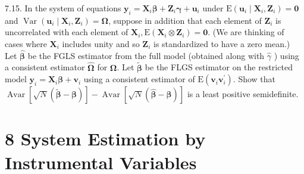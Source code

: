 \documentclass[10pt]{article}
\begin{document}
7.15. In the system of equations $\mathbf{y}_{i}=\mathbf{X}_{i} \boldsymbol{\beta}+\mathbf{Z}_{i} \boldsymbol{\gamma}+\mathbf{u}_{i}$ under $\mathrm{E}\left(\mathbf{u}_{i} \mid \mathbf{X}_{i}, \mathbf{Z}_{i}\right)=\mathbf{0}$ and $\operatorname{Var}\left(\mathbf{u}_{i} \mid \mathbf{X}_{i}, \mathbf{Z}_{i}\right)=\boldsymbol{\Omega}$, suppose in addition that each element of $\mathbf{Z}_{i}$ is uncorrelated with each element of $\mathbf{X}_{i}, \mathrm{E}\left(\mathbf{X}_{i} \otimes \mathbf{Z}_{i}\right)=\mathbf{0}$. (We are thinking of cases where $\mathbf{X}_{i}$ includes unity and so $\mathbf{Z}_{i}$ is standardized to have a zero mean.) Let $\hat{\boldsymbol{\beta}}$ be the FGLS estimator from the full model (obtained along with $\hat{\gamma}$ ) using a consistent estimator $\hat{\boldsymbol{\Omega}}$ for $\boldsymbol{\Omega}$. Let $\tilde{\boldsymbol{\beta}}$ be the FLGS estimator on the restricted model $\mathbf{y}_{i}=\mathbf{X}_{i} \boldsymbol{\beta}+\mathbf{v}_{i}$ using a consistent estimator of $\mathrm{E}\left(\mathbf{v}_{i} \mathbf{v}_{i}^{\prime}\right)$. Show that $\operatorname{Avar}[\sqrt{N}(\tilde{\boldsymbol{\beta}}-\boldsymbol{\beta})]-\operatorname{Avar}[\sqrt{N}(\hat{\boldsymbol{\beta}}-\boldsymbol{\beta})]$ is a least positive semidefinite.

\section*{8 System Estimation by Instrumental Variables}
\end{document}
